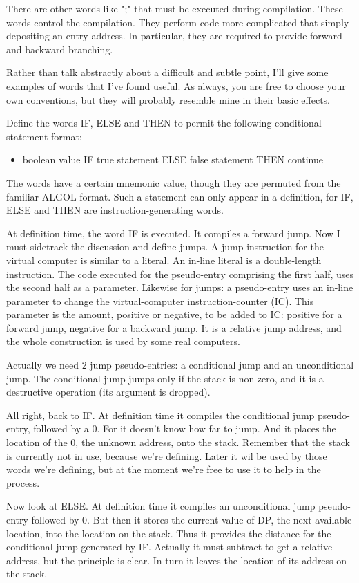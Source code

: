 \documentclass[b5paper, oneside]{book}
\begin{document}
There are other words like ";" that must be executed during compilation. These words control the compilation. They perform code more complicated that simply depositing an entry address. In particular, they are required to provide forward and backward branching.

Rather than talk abstractly about a difficult and subtle point, I'll give some examples of words that I've found useful. As always, you are free to choose your own conventions, but they will probably resemble mine in their basic effects.

Define the words IF, ELSE and THEN to permit the following conditional statement format:\begin{itemize}
   \item boolean value IF true statement ELSE false statement THEN continue\end{itemize}
The words have a certain mnemonic value, though they are permuted from the familiar ALGOL format. Such a statement can only appear in a definition, for IF, ELSE and THEN are instruction-generating words.

At definition time, the word IF is executed. It compiles a forward jump. Now I must sidetrack the discussion and define jumps. A jump instruction for the virtual computer is similar to a literal. An in-line literal is a double-length instruction. The code executed for the pseudo-entry comprising the first half, uses the second half as a parameter. Likewise for jumps: a pseudo-entry uses an in-line parameter to change the virtual-computer instruction-counter (IC). This parameter is the amount, positive or negative, to be added to IC: positive for a forward jump, negative for a backward jump. It is a relative jump address, and the whole construction is used by some real computers.

Actually we need 2 jump pseudo-entries: a conditional jump and an unconditional jump. The conditional jump jumps only if the stack is non-zero, and it is a destructive operation (its argument is dropped).

All right, back to IF. At definition time it compiles the conditional jump pseudo-entry, followed by a 0. For it doesn't know how far to jump. And it places the location of the 0, the unknown address, onto the stack. Remember that the stack is currently not in use, because we're defining. Later it wil be used by those words we're defining, but at the moment we're free to use it to help in the process.

Now look at ELSE. At definition time it compiles an unconditional jump pseudo-entry followed by 0. But then it stores the current value of DP, the next available location, into the location on the stack. Thus it provides the distance for the conditional jump generated by IF. Actually it must subtract to get a relative address, but the principle is clear. In turn it leaves the location of its address on the stack.
\end{document}
